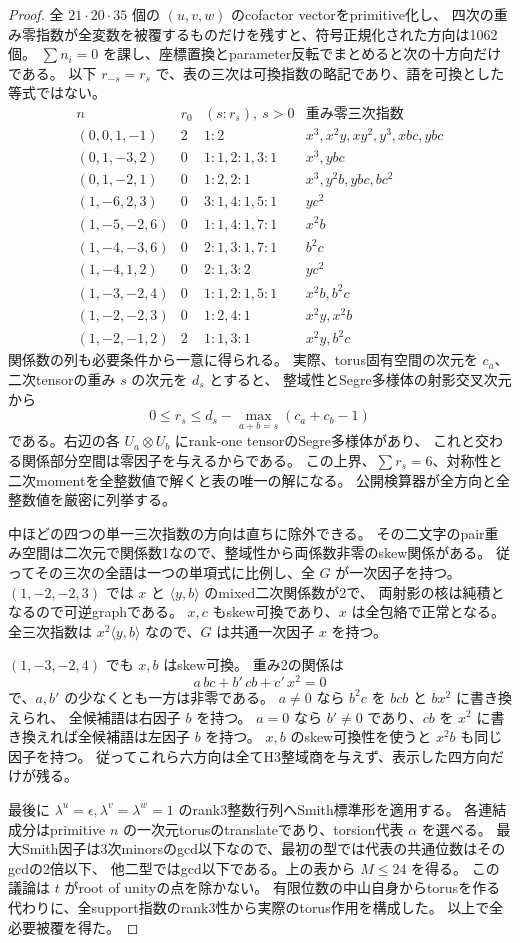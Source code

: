 \begin{proof}
全 $21\cdot20\cdot35$ 個の $(u,v,w)$ のcofactor vectorをprimitive化し、
四次の重み零指数が全変数を被覆するものだけを残すと、符号正規化された方向は1062個。
$\sum n_i=0$ を課し、座標置換とparameter反転でまとめると次の十方向だけである。
以下 $r_{-s}=r_s$ で、表の三次は可換指数の略記であり、語を可換とした等式ではない。
\[
\begin{array}{c|c|l|l}
 n&r_0&(s:r_s),\ s>0&\text{重み零三次指数}\\\hline
 (0,0,1,-1)&2&1:2&x^3,x^2y,xy^2,y^3,xbc,ybc\\
 (0,1,-3,2)&0&1:1,2:1,3:1&x^3,ybc\\
 (0,1,-2,1)&0&1:2,2:1&x^3,y^2b,ybc,bc^2\\
 (1,-6,2,3)&0&3:1,4:1,5:1&yc^2\\
 (1,-5,-2,6)&0&1:1,4:1,7:1&x^2b\\
 (1,-4,-3,6)&0&2:1,3:1,7:1&b^2c\\
 (1,-4,1,2)&0&2:1,3:2&yc^2\\
 (1,-3,-2,4)&0&1:1,2:1,5:1&x^2b,b^2c\\
 (1,-2,-2,3)&0&1:2,4:1&x^2y,x^2b\\
 (1,-2,-1,2)&2&1:1,3:1&x^2y,b^2c
\end{array}
\]
関係数の列も必要条件から一意に得られる。
実際、torus固有空間の次元を $c_a$、二次tensorの重み $s$ の次元を $d_s$ とすると、
整域性とSegre多様体の射影交叉次元から
\[
 0\le r_s\le d_s-\max_{a+b=s}(c_a+c_b-1)
\]
である。右辺の各 $U_a\otimes U_b$ にrank-one tensorのSegre多様体があり、
これと交わる関係部分空間は零因子を与えるからである。
この上界、$\sum r_s=6$、対称性と二次momentを全整数値で解くと表の唯一の解になる。
公開検算器が全方向と全整数値を厳密に列挙する。

中ほどの四つの単一三次指数の方向は直ちに除外できる。
その二文字のpair重み空間は二次元で関係数1なので、整域性から両係数非零のskew関係がある。
従ってその三次の全語は一つの単項式に比例し、全 $G$ が一次因子を持つ。
$(1,-2,-2,3)$ では $x$ と $\langle y,b\rangle$ のmixed二次関係数が2で、
両射影の核は純積となるので可逆graphである。
$x,c$ もskew可換であり、$x$ は全包絡で正常となる。
全三次指数は $x^2\langle y,b\rangle$ なので、$G$ は共通一次因子 $x$ を持つ。

$(1,-3,-2,4)$ でも $x,b$ はskew可換。
重み2の関係は
\[
 a\,bc+b'\,cb+c'\,x^2=0
\]
で、$a,b'$ の少なくとも一方は非零である。
$a\ne0$ なら $b^2c$ を $bcb$ と $bx^2$ に書き換えられ、
全候補語は右因子 $b$ を持つ。
$a=0$ なら $b'\ne0$ であり、$cb$ を $x^2$ に書き換えれば全候補語は左因子 $b$ を持つ。
$x,b$ のskew可換性を使うと $x^2b$ も同じ因子を持つ。
従ってこれら六方向は全てH3整域商を与えず、表示した四方向だけが残る。

最後に $\lambda^u=\epsilon,\lambda^v=\lambda^w=1$ のrank3整数行列へSmith標準形を適用する。
各連結成分はprimitive $n$ の一次元torusのtranslateであり、torsion代表 $\alpha$ を選べる。
最大Smith因子は3次minorsのgcd以下なので、最初の型では代表の共通位数はそのgcdの2倍以下、
他二型ではgcd以下である。上の表から $M\le24$ を得る。
この議論は $t$ がroot of unityの点を除かない。
有限位数の中山自身からtorusを作る代わりに、全support指数のrank3性から実際のtorus作用を構成した。
以上で全必要被覆を得た。
\end{proof}

